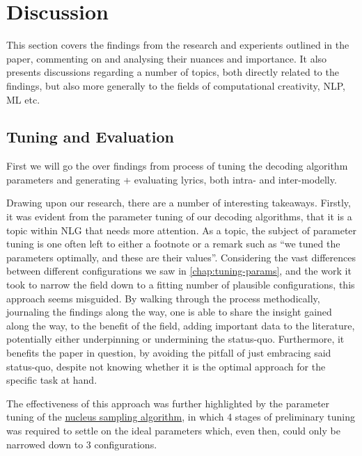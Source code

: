 \label{chap:discussion}
\section{Discussion}

This section covers the findings from the research and experients outlined in the paper, commenting on and analysing their nuances and importance. It also presents discussions regarding a number of topics, both directly related to the findings, but also more generally to the fields of computational creativity, NLP, ML etc.

\subsection{Tuning and Evaluation}
\label{sec:tuning+eval-discussion}

First we will go the over findings from process of tuning the decoding algorithm parameters and generating + evaluating lyrics, both intra- and inter-modelly.

Drawing upon our research, there are a number of interesting takeaways. Firstly, it was evident from the parameter tuning of our decoding algorithms, that it is a topic within NLG that needs more attention. As a topic, the subject of parameter tuning is one often left to either a footnote or a remark such as “we tuned the parameters optimally, and these are their values”. Considering the vast differences between different configurations we saw in \cref{chap:tuning-params}, and the work it took to narrow the field down to a fitting number of plausible configurations, this approach seems misguided. By walking through the process methodically, journaling the findings along the way, one is able to share the insight gained along the way, to the benefit of the field, adding important data to the literature, potentially either underpinning or undermining the status-quo. Furthermore, it benefits the paper in question, by avoiding the pitfall of just embracing said status-quo, despite not knowing whether it is the optimal approach for the specific task at hand. 

The effectiveness of this approach was further highlighted by the parameter tuning of the \hyperref[sec:tuningnucleus]{nucleus sampling algorithm}, in which 4 stages of preliminary tuning was required to settle on the ideal parameters which, even then, could only be narrowed down to 3 configurations. \\\\\\

